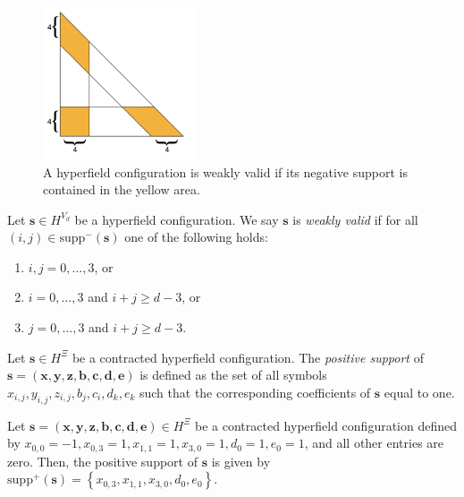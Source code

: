 \begin{figure}[H]
    \centering
    \includegraphics[width=0.4\textwidth]{assets/weakly-valid.png}
    \caption{A hyperfield configuration is weakly valid if its negative support is contained in the yellow area.}
\end{figure}

\begin{definition}
    Let \( \mathbf{s} \in H^{V_d} \) be a hyperfield configuration. We say \( \mathbf{s} \) is \emph{weakly valid} if for all \( (i,j) \in \mathrm{supp}^-(\mathbf{s}) \) one of the following holds:
    \begin{enumerate}
        \item \( i,j = 0, \dots, 3 \), or
        \item \( i = 0, \dots, 3 \) and \( i+j \geq d-3 \), or
        \item \( j = 0, \dots, 3 \) and \( i + j \geq d-3 \).
    \end{enumerate}
\end{definition}

\begin{definition}
    Let \( \mathbf{s} \in H^{\Xi} \) be a contracted hyperfield configuration. The \emph{positive support} of \( \mathbf{s} = (\mathbf{x}, \mathbf{y}, \mathbf{z}, \mathbf{b}, \mathbf{c}, \mathbf{d}, \mathbf{e}) \) is defined as the set of all symbols \( x_{i,j}, y_{i,j}, z_{i,j}, b_j, c_i, d_k, e_k \) such that the corresponding coefficients of \( \mathbf{s} \) equal to one.
\end{definition}

\begin{example}
    Let \( \mathbf{s} = (\mathbf{x}, \mathbf{y}, \mathbf{z}, \mathbf{b}, \mathbf{c}, \mathbf{d}, \mathbf{e}) \in H^{\Xi}\) be a contracted hyperfield configuration defined by \( x_{0,0} = -1,  x_{0,3} = 1,  x_{1,1} = 1, x_{3,0} = 1, d_0 = 1,  e_0 = 1 \), and all other entries are zero. Then, the positive support of \( \mathbf{s} \) is given by \( \mathrm{supp}^+(\mathbf{s}) = \left\{ x_{0,3}, x_{1,1}, x_{3,0}, d_0, e_0 \right\} \).
\end{example}

